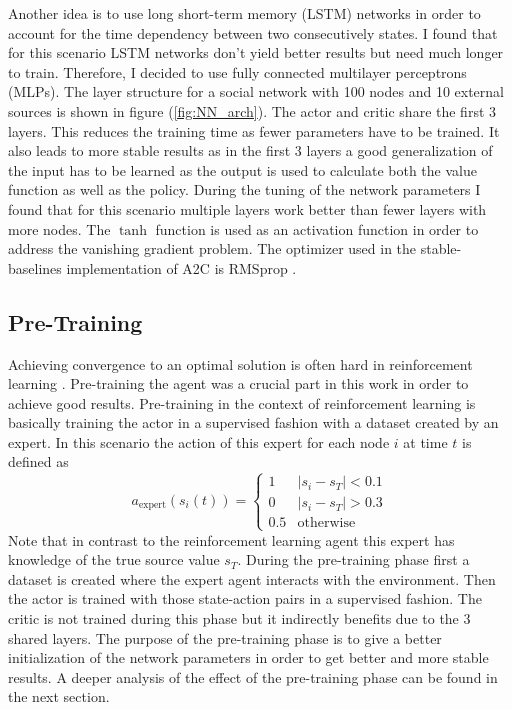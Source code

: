 \documentclass[11pt, a4paper]{article}
\begin{document}
Another idea is to use long short-term memory (LSTM) networks in order to account for the time dependency between two consecutively states. I found that for this scenario LSTM networks don't yield better results but need much longer to train. Therefore, I decided to use fully connected multilayer perceptrons (MLPs). The layer structure for a social network with 100 nodes and 10 external sources is shown in figure (\ref{fig:NN_arch}). The actor and critic share the first 3 layers. This reduces the training time as fewer parameters have to be trained. It also leads to more stable results as in the first 3 layers a good generalization of the input has to be learned as the output is used to calculate both the value function as well as the policy. During the tuning of the network parameters I found that for this scenario multiple layers work better than fewer layers with more nodes. The $\tanh$ function is used as an activation function in order to address the vanishing gradient problem. The optimizer used in the stable-baselines implementation of A2C is RMSprop \cite{RMSprop}.

\subsection{Pre-Training}
Achieving convergence to an optimal solution is often hard in reinforcement learning \cite{rlblogpost}. Pre-training the agent was a crucial part in this work in order to achieve good results. Pre-training in the context of reinforcement learning is basically training the actor in a supervised fashion with a dataset created by an expert. In this scenario the action of this expert for each node $i$ at time $t$ is defined as
%
\begin{equation}
	a_{\text{expert}}(s_i(t)) = \begin{cases}
			1 & |s_i - s_T| < 0.1 \\
			0 & |s_i - s_T| > 0.3 \\
			0.5 & \text{otherwise}
		\end{cases}
\end{equation}
%
Note that in contrast to the reinforcement learning agent this expert has knowledge of the true source value $s_T$. During the pre-training phase first a dataset is created where the expert agent interacts with the environment. Then the actor is trained with those state-action pairs in a supervised fashion. The critic is not trained during this phase but it indirectly benefits due to the 3 shared layers. The purpose of the pre-training phase is to give a better initialization of the network parameters in order to get better and more stable results. A deeper analysis of the effect of the pre-training phase can be found in the next section.
\end{document}
